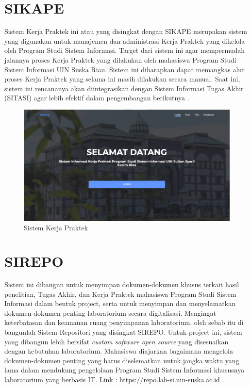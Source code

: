 \section{SIKAPE}
Sistem Kerja Praktek ini atau yang disingkat dengan SIKAPE merupakan sistem yang digunakan untuk manajemen dan administrasi Kerja Praktek yang dikelola oleh Program Studi Sistem Informasi. Target dari sistem ini agar mempermudah jalannya proses Kerja Praktek yang dilakukan oleh mahasiswa Program Studi Sistem Informasi UIN Suska Riau. Sistem ini diharapkan dapat memangkas alur proses Kerja Praktek yang selama ini masih dilakukan secara manual. Saat ini, sistem ini rencananya akan diintegrasikan dengan Sistem Informasi Tugas Akhir (SITASI) agar lebih efektif dalam pengembangan berikutnya \cite{web-prodi}.

\begin{figure}
	\centering
	\includegraphics[width=0.82\linewidth]{konten//gambar/sikape.png}
	\caption{Sistem Kerja Praktek \protect\cite{web-prodi}}
	\label{fig:enter-label}
\end{figure}

\section{SIREPO}
Sistem ini dibangun untuk menyimpan dokumen-dokumen khusus terkait hasil penelitian, Tugas Akhir, dan Kerja Praktek mahasiswa Program Studi Sistem Informasi dalam bentuk project, serta untuk menyimpan dan menyelamatkan dokumen-dokumen penting laboratorium secara digitalisasi. Mengingat keterbatasan dan keamanan ruang penyimpanan laboratorium, oleh sebab itu di bangunlah Sistem Repositori yang disingkat SIREPO. Untuk project ini, sistem yang dibangun lebih bersifat \textit{custom software open source} yang disesuaikan dengan kebutuhan laboratorium. Mahasiswa diajarkan bagaimana mengelola dokumen-dokumen penting yang harus diselematkan untuk jangka waktu yang lama dalam mendukung pengelolaan Program Studi Sistem Informasi khususnya laboratorium yang berbasis IT. Link : https://repo.lab-si.uin-suska.ac.id \cite{web-prodi}.

